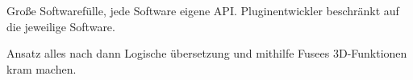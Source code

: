  \label{sec:Frage}


Große Softwarefülle, jede Software eigene API. Pluginentwickler beschränkt auf die jeweilige Software.

Ansatz alles nach \cs dann Logische übersetzung und mithilfe Fusees 3D-Funktionen kram machen.